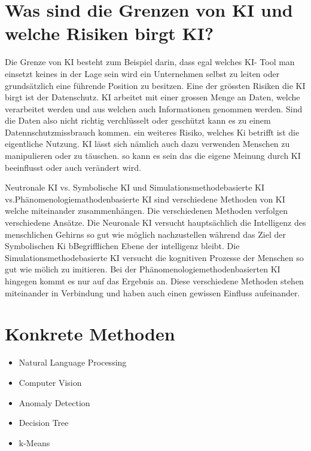 \documentclass{report}
\begin{document}
\section{Was sind die Grenzen von KI und welche Risiken birgt KI?}
Die Grenze von KI besteht zum Beispiel darin, dass egal welches KI- Tool man einsetzt keines in der Lage sein wird ein Unternehmen selbst zu leiten oder grundsätzlich eine führende Position zu besitzen.
Eine der grössten Risiken die KI birgt ist der Datenschutz. KI arbeitet mit einer grossen Menge an Daten, welche verarbeitet werden und aus welchen auch Informationen genommen werden. 
Sind die Daten also nicht richtig verchlüsselt oder geschützt kann es zu einem Datennschutzmissbrauch kommen. 
ein weiteres Risiko, welches Ki betrifft ist die eigentliche Nutzung. KI lässt sich nämlich auch dazu verwenden Menschen zu manipulieren oder zu täuschen. 
so kann es sein das die eigene Meinung durch KI beeinflusst oder auch verändert wird. 

Neutronale KI vs. Symbolische KI  und Simulationsmethodebasierte KI vs.Phänomenologiemathodenbasierte KI sind verschiedene Methoden von KI welche miteinander zusammenhängen. 
Die verschiedenen Methoden verfolgen verschiedene Ansätze. Die Neuronale KI versucht hauptsächlich die Intelligenz des menschlichen Gehirns so gut wie möglich nachzustellen während das Ziel der Symbolischen Ki bBegrifflichen Ebene der intelligenz bleibt. 
Die Simulationsmethodebasierte KI versucht die kognitiven Prozesse der Menschen so gut wie mölich zu imitieren. Bei der Phänomenologiemethodenbasierten KI hingegen kommt es nur auf das Ergebnis an. 
Diese verschiedene Methoden stehen miteinander in Verbindung und haben auch einen gewissen Einfluss aufeinander. 


\section{Konkrete Methoden}
\begin{itemize}
\item Natural Language Processing
\item Computer Vision
\item Anomaly Detection
\item Decision Tree 
\item k-Means
\end{itemize}

\nocite{*}
\printbibliography
\end{document}
